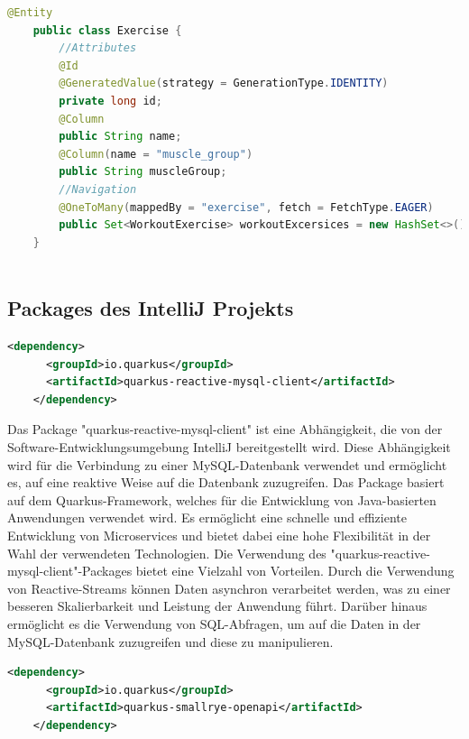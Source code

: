 \begin{lstlisting}[language=Java,caption=Entity | Exersice,label=lst:impl:foo]
    @Entity
    public class Exercise {
        //Attributes
        @Id
        @GeneratedValue(strategy = GenerationType.IDENTITY)
        private long id;  
        @Column
        public String name;
        @Column(name = "muscle_group")
        public String muscleGroup;
        //Navigation
        @OneToMany(mappedBy = "exercise", fetch = FetchType.EAGER)
        public Set<WorkoutExercise> workoutExcersices = new HashSet<>();
    }
    
\end{lstlisting}

\newpage
\subsection{Packages des IntelliJ Projekts}

\begin{lstlisting}[language=XML,caption=Dependency | reactive-mysql-client,label=lst:impl:foo]
    <dependency>
      <groupId>io.quarkus</groupId>
      <artifactId>quarkus-reactive-mysql-client</artifactId>
    </dependency>
\end{lstlisting}

Das Package "quarkus-reactive-mysql-client" ist eine Abhängigkeit, die von der Software-Entwicklungsumgebung IntelliJ bereitgestellt wird. Diese Abhängigkeit wird für die Verbindung zu einer MySQL-Datenbank verwendet und ermöglicht es, auf eine reaktive Weise auf die Datenbank zuzugreifen.
\newline
\newline
Das Package basiert auf dem Quarkus-Framework, welches für die Entwicklung von Java-basierten Anwendungen verwendet wird. Es ermöglicht eine schnelle und effiziente Entwicklung von Microservices und bietet dabei eine hohe Flexibilität in der Wahl der verwendeten Technologien.
\newline
\newline
Die Verwendung des "quarkus-reactive-mysql-client"-Packages bietet eine Vielzahl von Vorteilen. Durch die Verwendung von Reactive-Streams können Daten asynchron verarbeitet werden, was zu einer besseren Skalierbarkeit und Leistung der Anwendung führt. Darüber hinaus ermöglicht es die Verwendung von SQL-Abfragen, um auf die Daten in der MySQL-Datenbank zuzugreifen und diese zu manipulieren.

\begin{lstlisting}[language=XML,caption=Dependency | smallrye-openapi,label=lst:impl:foo]
    <dependency>
      <groupId>io.quarkus</groupId>
      <artifactId>quarkus-smallrye-openapi</artifactId>
    </dependency>
\end{lstlisting}

